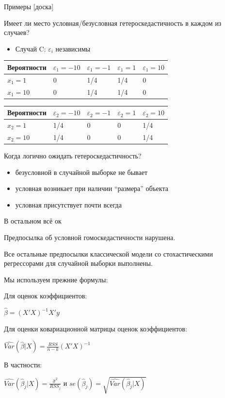 \documentclass[ignorenonframetext,]{beamer}
\newcommand{\e}{\varepsilon}
\begin{document}
\begin{frame}{Примеры {[}доска{]}}

Имеет ли место условная/безусловная гетероскедастичность в каждом из
случаев?

\begin{itemize}
\itemsep1pt\parskip0pt
\item
  Случай C: \(\e_i\) независимы
\end{itemize}

\begin{longtable}[c]{@{}lllll@{}}
\toprule
Вероятности & \(\e_1=-10\) & \(\e_1=-1\) & \(\e_1=1\) &
\(\e_1=10\)\tabularnewline
\midrule
\endhead
\(x_1=1\) & 0 & 1/4 & 1/4 & 0\tabularnewline
\(x_1=10\) & 0 & 1/4 & 1/4 & 0\tabularnewline
\bottomrule
\end{longtable}

\begin{longtable}[c]{@{}lllll@{}}
\toprule
Вероятности & \(\e_2=-10\) & \(\e_2=-1\) & \(\e_2=1\) &
\(\e_2=10\)\tabularnewline
\midrule
\endhead
\(x_2=1\) & 1/4 & 0 & 0 & 1/4\tabularnewline
\(x_2=10\) & 1/4 & 0 & 0 & 1/4\tabularnewline
\bottomrule
\end{longtable}

\end{frame}

\begin{frame}{Когда логично ожидать гетероскедастичность?}

\begin{itemize}
\item
  безусловной в случайной выборке не бывает
\item
  условная возникает при наличии ``размера'' объекта
\item
  условная присутствует почти всегда
\end{itemize}

\end{frame}

\begin{frame}{В остальном всё ок}

Предпосылка об условной гомоскедастичности нарушена.

Все остальные предпосылки классической модели со стохастическими
регрессорами для случайной выборки выполнены.

\end{frame}

\begin{frame}{Мы используем прежние формулы:}

Для оценок коэффициентов:

\(\hat{\beta}=(X'X)^{-1}X'y\)

Для оценки ковариационной матрицы оценок коэффициентов:

\(\widehat{Var}(\hat{\beta}|X)=\frac{RSS}{n-k}(X'X)^{-1}\)

В частности:

\(\widehat{Var}(\hat{\beta}_j|X)=\frac{\hat{\sigma}^2}{RSS_j}\) и
\(se(\hat{\beta}_j)=\sqrt{\widehat{Var}(\hat{\beta}_j|X)}\)

\end{frame}
\end{document}
